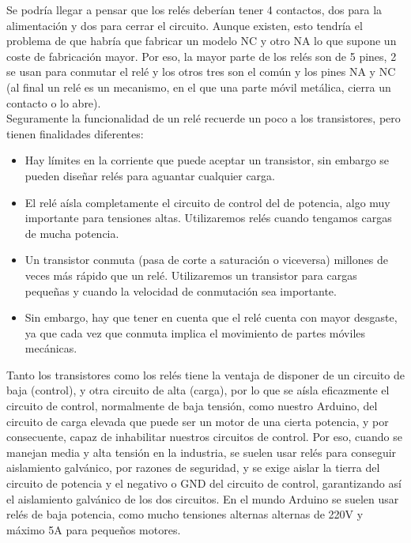 \documentclass[12pt]{article}
\begin{document}
	\noindent Se podría llegar a pensar que los relés deberían tener 4 contactos, dos para la alimentación y dos para cerrar el circuito. Aunque existen, esto tendría el problema de que habría que fabricar un modelo NC y otro NA lo que supone un coste de fabricación mayor. Por eso, la mayor parte de los relés son de 5 pines, 2 se usan para conmutar el relé y los otros tres son el común y los pines NA y NC (al final un relé es un mecanismo, en el que una parte móvil metálica, cierra un contacto o lo abre). \\
	
	\noindent Seguramente la funcionalidad de un relé recuerde un poco a los transistores, pero tienen finalidades diferentes:
	
	\begin{itemize}
		\item Hay límites en la corriente que puede aceptar un transistor, sin embargo se pueden diseñar relés para aguantar cualquier carga.
		\item El relé aísla completamente el circuito de control del de potencia, algo muy importante para tensiones altas. Utilizaremos relés cuando tengamos cargas de mucha potencia.
		\item Un transistor conmuta (pasa de corte a saturación o viceversa) millones de veces más rápido que un relé.  Utilizaremos un transistor para cargas pequeñas y cuando la velocidad de conmutación sea importante.
		\item Sin embargo, hay que tener en cuenta que el relé cuenta con mayor desgaste, ya que cada vez que conmuta implica el movimiento de partes móviles mecánicas.
	\end{itemize}
	
	\noindent Tanto los transistores como los relés tiene la ventaja de disponer de un circuito de baja (control), y otra circuito de alta (carga), por lo que se aísla eficazmente el circuito de control, normalmente de baja tensión, como nuestro Arduino, del circuito de carga elevada que puede ser un motor de una cierta potencia, y por consecuente, capaz de inhabilitar nuestros circuitos de control. Por eso, cuando se manejan media y alta tensión en la industria, se suelen usar relés para conseguir aislamiento galvánico, por razones de seguridad, y se exige aislar la tierra del circuito de potencia y el negativo o GND del circuito de control, garantizando así el aislamiento galvánico de los dos circuitos. En el mundo Arduino se suelen usar relés de baja potencia, como mucho tensiones alternas alternas de 220V y máximo 5A para pequeños motores.
	
\end{document}
